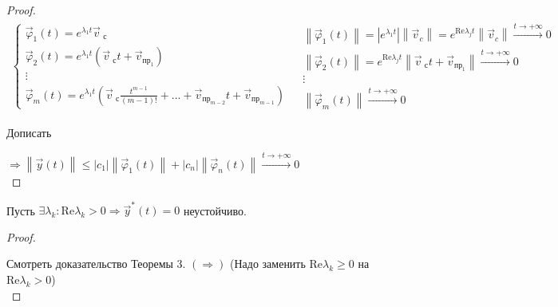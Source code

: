 \documentclass[12pt, a4paper]{report}
\begin{document}
\begin{proof}
    \[ \begin{aligned}
        \begin{cases}
            \vec{\varphi }_1 (t ) = e^{ \lambda_1 t } \vec{v } _{\text{ с} }  \\
            \vec{\varphi }_2  (t ) = e^{ \lambda_1t }(  \vec{v } _{\text{ с} }t +\vec{ v } _{\text{пр}_{1}}  )\\
            \vdots \\
            \vec{\varphi }_m (t ) = e^{ \lambda_1 t }  \left( \vec{v } _{\text{ с} } \frac{t ^{m-1 } }{(m-1 )! } +... + \vec{ v } _{\text{пр}_{m-2}   } t + \vec{v } _{\text{пр}_{m-1}  }    \right)
        \end{cases} 
        \begin{aligned}
        &\left\lVert \vec{\varphi }_1 (t) \right\rVert = \left\lvert e^{ \lambda_1 t }  \right\rvert \left\lVert \vec{ v } _{c}  \right\rVert = e^{ \mathrm{Re }  \lambda_j t } \left\lVert \vec{v } _c   \right\rVert \xrightarrow{t \to + \infty } 0   \\
        &\left\lVert \vec{\varphi }_2 (t) \right\rVert  = e^{ \mathrm{Re }  \lambda_j t } \left\lVert  \vec{v } _{\text{ с} }t +\vec{ v } _{\text{пр}_{1}} \right\rVert \xrightarrow{t \to + \infty } 0   \\
        &\vdots \\ 
        &\left\lVert \vec{\varphi }_m (t)  \right\rVert \xrightarrow{t \to  + \infty } 0  
        \end{aligned}
    \end{aligned}\] 

Дописать 

\( \Rightarrow \left\lVert \vec{y } (t ) \right\rVert \le  \left\lvert  c_1  \right\rvert \left\lVert \vec{\varphi }_1 (t)  \right\rVert + \left\lvert  c_n\right\rvert \left\lVert \vec{\varphi }_n (t)  \right\rVert \xrightarrow{t \to  + \infty } 0   \) \\

\end{proof}

\begin{theorem}
    Пусть \( \exists \lambda_k : \mathrm{Re }  \lambda_k > 0 \Rightarrow \vec{y}  ^ * (t ) = 0   \) неустойчиво.
\end{theorem}

\begin{proof} \(  \) 

    Смотреть доказательство Теоремы 3. \( (\Rightarrow) \) (Надо заменить \( \mathrm{Re }  \lambda_k \ge  0  \) на \( \mathrm{Re }  \lambda_k > 0  \))\\

\end{proof}
\end{document}
